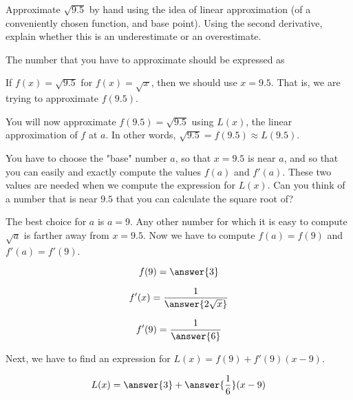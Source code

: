 \documentclass{ximera}
\author{Steven Gubkin\and Nela Lakos \and Bobby Ramsey}
\begin{document}
\begin{exercise}

Approximate $\sqrt{9.5}$ by hand using the idea of linear approximation (of a conveniently chosen function, and base point).  Using the second derivative, explain whether this is an underestimate or an overestimate.
\begin {hint}

The number that you have to approximate should be expressed as

 If $f(x) = \sqrt{9.5}$ for $f(x) = \sqrt{x}$, then we should use $x=9.5$. That is, we are trying to approximate $f(9.5)$.

\end {hint}

\begin {hint}

You will now approximate  $f(9.5) = \sqrt{9.5}$ using $L(x)$, the linear approximation of $f$ at $a$.
In other words, $\sqrt{9.5}=f(9.5) \approx L(9.5)$.

You have to choose the "base" number $a$, so that $x=9.5$ is near $a$, and so that you can easily and exactly compute the values $f(a)$ and $f'(a)$. These two values are needed when we compute the expression for $L(x)$. Can you think of a number that is near $9.5$ that you can calculate the square root of?
\end {hint}
\begin {hint}
The best choice for $a$ is $a=9$. Any other number for which it is easy to compute $\sqrt{a}$ is farther away from $x=9.5$.
Now we have to compute $f(a)=f(9)$ and $f'(a)=f'(9)$.
\begin{prompt}
	$$f(9)=  \answer{3}$$
	\end{prompt}
	\begin{prompt}
	$$f'(x)= \frac{1}{ \answer{2\sqrt{x}}}$$
	\end{prompt}
	\begin{prompt}
	$$f'(9)= \frac{1}{ \answer{6}}$$
	\end{prompt}
\end {hint}
\begin {hint}

Next, we have to find an expression for $L(x)=f(9)+f'(9)(x-9)$.
\begin{prompt}
	$$L(x)= \answer{3}+\answer{\frac{1}{6}}(x-9)$$
	\end{prompt}
 
\end {hint}
\begin {hint}


\end{hint}
\end{exercise}
\end{document}
